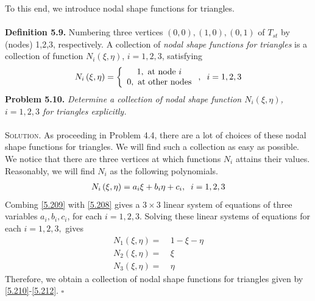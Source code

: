 \documentclass[a4paper]{article}
\numberwithin{equation}{section}
\begin{document}
To this end, we introduce nodal shape functions for triangles.\\
\\
\textbf{Definition 5.9.} Numbering three vertices $\left( {0,0} \right),\left( {1,0} \right),\left( {0,1} \right)$ of $T_{st}$ by (nodes) 1,2,3, respectively. A collection of \textit{nodal shape functions for triangles} is a collection of function $N_i\left(\xi,\eta \right)$, $i=1,2,3$, satisfying
\begin{align}
\label{5.208}
{N_i}\left( {\xi ,\eta } \right) = \left\{ {\begin{array}{*{20}{c}}
{1,\mbox{ at node }i}\\
{0,\mbox{ at other nodes}}
\end{array}} \right.,\hspace{0.2cm} i = 1,2,3
\end{align}
\textbf{Problem 5.10.} \textit{Determine a collection of nodal shape function $N_i\left(\xi,\eta \right)$, $i=1,2,3$ for triangles explicitly.}\\
\\
\textsc{Solution.} As proceeding in Problem 4.4, there are a lot of choices of these nodal shape functions for triangles. We will find such a collection as easy as possible. We notice that there are three vertices at which functions $N_i$ attains their values. Reasonably, we will find $N_i$ as the following polynomials.
\begin{align}
\label{5.209}
{N_i}\left( {\xi ,\eta } \right) = {a_i}\xi  + {b_i}\eta  + {c_i},\hspace{0.2cm}i = 1,2,3
\end{align} 
Combing \eqref{5.209} with \eqref{5.208} gives a $3\times 3$ linear system of equations of three variables $a_i,b_i,c_i$, for each $i=1,2,3$. Solving these linear systems of equations for each $i=1,2,3,$ gives
\begin{align}
\label{5.210}
{N_1}\left( {\xi ,\eta } \right) =&\ 1 - \xi  - \eta \\
{N_2}\left( {\xi ,\eta } \right) =&\ \xi \\
{N_3}\left( {\xi ,\eta } \right) =&\ \eta \label{5.212}
\end{align}
Therefore, we obtain a collection of nodal shape functions for triangles given by \eqref{5.210}-\eqref{5.212}. \hfill $\square$\\
\end{document}
